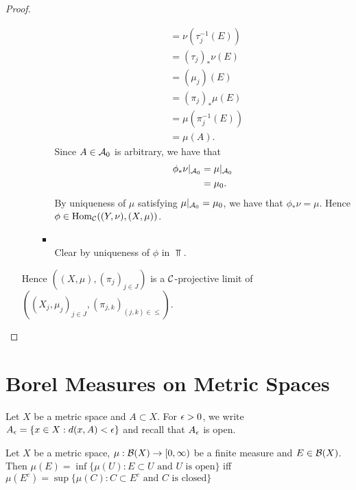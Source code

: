 \documentclass{book}
\begin{document}
\begin{proof}
\begin{enumerate}
\begin{itemize}
\begin{itemize}
\begin{align*}
					& = \nu(\tau_j^{-1}(E)) \\
					& = (\tau_j)_*\nu(E) \\
					& = (\mu_j)(E) \\
					& = (\pi_j)_*\mu(E) \\
					& = \mu(\pi_j^{-1}(E)) \\
					& = \mu(A).
				\end{align*}
				Since $A \in \mathcal{A}_0$ is arbitrary, we have that 
				\begin{align*}
					\phi_*\nu|_{\mathcal{A}_0}
					& = \mu|_{\mathcal{A}_0} \\
					& = \mu_0. 
				\end{align*}
				By uniqueness of $\mu$ satisfying $\mu|_{\mathcal{A}_0} = \mu_0$, we have that $\phi_*\nu = \mu$. Hence $\phi \in \operatorname{Hom}_{\mathcal{C}}((Y, \nu), (X, \mu))$.
				\item {} \\
				Clear by uniqueness of $\phi$ in $\Top$. 
			\end{itemize}
		\end{itemize}
		Hence $((X, \mu), (\pi_j)_{j \in J})$ is a $\mathcal{C}$-projective limit of $((X_j, \mu_j)_{j \in J}, (\pi_{j,k})_{(j,k) \in {\leq}})$.
	\end{enumerate}
\end{proof}
	
	
	
	
	
	
	
	
	

	
	
	
	
	
	
	
	
	
	
	
	
	\newpage
	\section{Borel Measures on Metric Spaces}
	\begin{note}
		Let $X$ be a metric space and $A \subset X$. For $\epsilon >0$, we write $A_{\epsilon} = \{x \in X: d(x, A) < \epsilon\}$ and recall that $A_{\epsilon}$ is open.
	\end{note}

	\begin{ex}
		Let $X$ be a metric space, $\mu: \mathcal{B}(X) \rightarrow [0,\infty)$ be a finite measure and $E \in \mathcal{B}(X)$. Then 
		$\mu(E) = \inf  \{\mu(U): E \subset U \text{ and $U$ is open} \}$ iff $\mu(E^c) = \sup  \{\mu(C): C \subset E^c \text{ and $C$ is closed} \}$ \\
	\end{ex}
\end{document}
